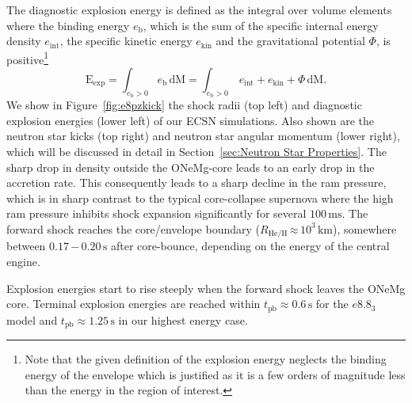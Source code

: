 \documentclass[fleqn,usenatbib]{mnras}
\renewcommand{\sec}{\xspace\ensuremath{\text{s}}}
\begin{document}
The diagnostic explosion energy is defined as the integral over volume elements where the binding energy $e_\mathrm{b}$, which is the sum of the specific internal energy density $e_{\mathrm{int}}$, the specific kinetic energy $e_{\mathrm{kin}}$ and the gravitational potential $\Phi$, is positive\footnote{Note that the given definition of the explosion energy neglects the binding energy of the envelope which is justified as it is a few orders of magnitude less than the energy in the region of interest.}
\begin{equation}
    \mathrm{E}_{\mathrm{exp}} = \int_{e_{\mathrm{b}} > 0} e_{\mathrm{b}} \, \mathrm{dM} =
    \int_{e_{\mathrm{b}} > 0}\, e_{\mathrm{int}} + e_{\mathrm{kin}} + \Phi \, \mathrm{dM}.
    \label{equ:ene exp}
\end{equation}
We show in Figure~\ref{fig:e8pzkick} the shock radii (top left) and diagnostic explosion energies (lower left) of our ECSN simulations. Also shown are the neutron star kicks (top right) and neutron star angular momentum (lower right), which will be discussed in detail in Section~\ref{sec:Neutron Star Properties}.
The sharp drop in density outside the ONeMg-core leads to an early drop in the accretion rate. This consequently leads to a sharp decline in the ram pressure, which is in sharp contrast to the typical core-collapse supernova where the high ram pressure inhibits shock expansion significantly for several $100\,\text{ms}$. The forward shock reaches the core/envelope boundary ($R_{\mathrm{He/H}}\,\mathord{\approx}\,10^3\,\text{km}$), somewhere between $0.17\,\mathord{-}\,0.20\,\sec$ after core-bounce, depending on the energy of the central engine.

Explosion energies start to rise steeply when the forward shock leaves the ONeMg core. Terminal explosion energies are reached within $t_{\mathrm{pb}}\approx  0.6\,\text{s}$ for the $e8.8_{3}$ model and  $t_{\mathrm{pb}}\approx 1.25\,\text{s}$ in our highest energy case. 
\end{document}
